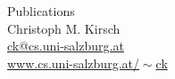 \documentclass[a4paper]{article}
\begin{document}


\begin{center}
{\sc \Large Publications} \\[5mm]
{\sc \large Christoph M. Kirsch} \\[2mm]
\href{mailto:ck@cs.uni-salzburg.at}{ck@cs.uni-salzburg.at} \\
\href{https://www.cs.uni-salzburg.at/~ck}{www.cs.uni-salzburg.at/$\!\sim$ck}
\end{center}


\end{document}
